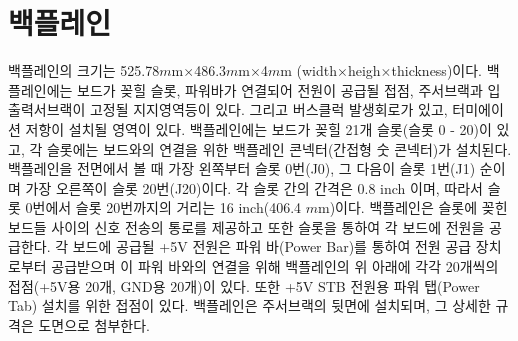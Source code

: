 \section{백플레인}
백플레인의 크기는
525.78$m$m$\times$486.3$m$m$\times$4$m$m
 (width$\times$heigh$\times$thickness)이다.
백플레인에는 보드가 꽂힐 슬롯, 파워바가 연결되어 전원이 공급될 접점,
주서브랙과 입출력서브랙이 고정될 지지영역등이 있다.
그리고 버스클럭 발생회로가 있고, 터미에이션 저항이 설치될 영역이 있다.
백플레인에는 보드가 꽂힐 21개 슬롯(슬롯 0 - 20)이 있고,
각 슬롯에는 보드와의 연결을 위한 백플레인 콘넥터(간접형 숫 콘넥터)가 설치된다.
백플레인을 전면에서 볼 때 가장 왼쪽부터 슬롯 0번(J0), 그 다음이 슬롯 1번(J1)
순이며 가장 오른쪽이 슬롯 20번(J20)이다.
각 슬롯 간의 간격은 0.8 inch 이며, 따라서 슬롯 0번에서 슬롯 20번까지의 거리는
16 inch(406.4 $m$m)이다.
백플레인은 슬롯에 꽂힌 보드들 사이의 신호 전송의 통로를 제공하고
또한 슬롯을 통하여 각 보드에 전원을 공급한다. 각 보드에 공급될 +5V 전원은
파워 바(Power Bar)를 통하여 전원 공급 장치로부터 공급받으며 이 파워 바와의
연결을 위해 백플레인의 위 아래에 각각 20개씩의 접점(+5V용 20개, GND용 20개)이 있다.
또한 +5V STB 전원용 파워 탭(Power Tab) 설치를 위한 접점이 있다.
백플레인은 주서브랙의 뒷면에 설치되며, 그 상세한 규격은 도면으로 첨부한다.
%

%
